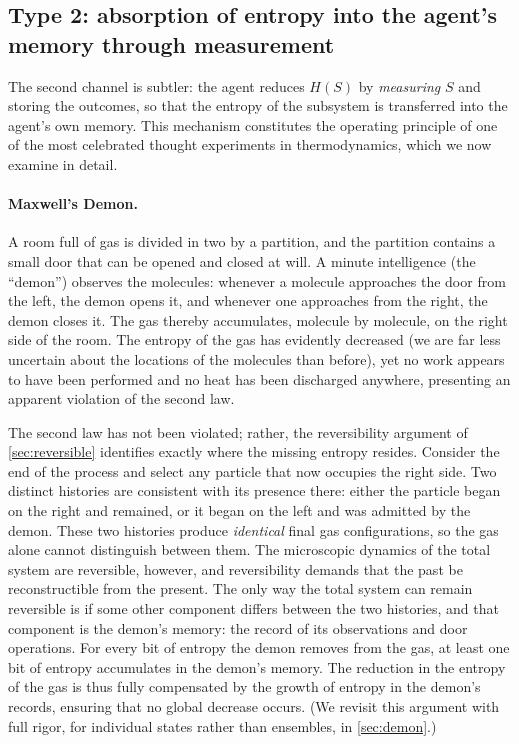 \documentclass[11pt]{article}
\begin{document}
\subsection{Type 2: absorption of entropy into the agent's memory through measurement}
\label{sec:type2}

The second channel is subtler: the agent reduces $H(S)$ by \emph{measuring} $S$ and storing the outcomes, so that the entropy of the subsystem is transferred into the agent's own memory. This mechanism constitutes the operating principle of one of the most celebrated thought experiments in thermodynamics, which we now examine in detail.

\paragraph{Maxwell's Demon.} A room full of gas is divided in two by a partition, and the partition contains a small door that can be opened and closed at will. A minute intelligence (the ``demon'') observes the molecules: whenever a molecule approaches the door from the left, the demon opens it, and whenever one approaches from the right, the demon closes it. The gas thereby accumulates, molecule by molecule, on the right side of the room. The entropy of the gas has evidently decreased (we are far less uncertain about the locations of the molecules than before), yet no work appears to have been performed and no heat has been discharged anywhere, presenting an apparent violation of the second law.

The second law has not been violated; rather, the reversibility argument of \cref{sec:reversible} identifies exactly where the missing entropy resides. Consider the end of the process and select any particle that now occupies the right side. Two distinct histories are consistent with its presence there: either the particle began on the right and remained, or it began on the left and was admitted by the demon. These two histories produce \emph{identical} final gas configurations, so the gas alone cannot distinguish between them. The microscopic dynamics of the total system are reversible, however, and reversibility demands that the past be reconstructible from the present. The only way the total system can remain reversible is if some other component differs between the two histories, and that component is the demon's memory: the record of its observations and door operations. For every bit of entropy the demon removes from the gas, at least one bit of entropy accumulates in the demon's memory. The reduction in the entropy of the gas is thus fully compensated by the growth of entropy in the demon's records, ensuring that no global decrease occurs. (We revisit this argument with full rigor, for individual states rather than ensembles, in \cref{sec:demon}.)
\end{document}
